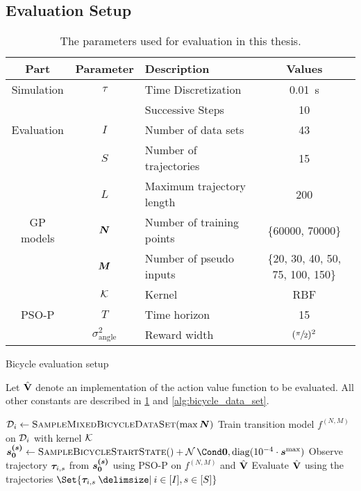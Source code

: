 \subsection{Evaluation Setup}
\begin{table}[t]
    \centering
    \caption{The parameters used for evaluation in this thesis.}
    \label{tab:evaluation_parameters}
    \begin{tabularx}{\tablewidth}{ccXc}
        \toprule
        Part & Parameter & Description & Values \\
        \midrule
        Simulation & $\tau$ & Time Discretization & \SI[mode=text]{0.01}{\second} \\
        & & Successive Steps & 10 \\
        \addlinespace
        Evaluation & $I$ & Number of data sets & 43 \\
        & $S$ & Number of trajectories & 15 \\
        & $L$ & Maximum trajectory length & 200 \\
        \addlinespace
        GP models & $\bm{N}$ & Number of training points & \{60000, 70000\} \\
        & $\bm{M}$ & Number of pseudo inputs & \{20, 30, 40, 50, 75, 100, 150\} \\
        & $\operatorname{\mathcal{K}}$ & Kernel & RBF \\
        \addlinespace
        PSO-P & $T$ & Time horizon & 15 \\
        & $\sigma_{\text{angle}}^2$ & Reward width & $(\sfrac{\pi}{2})^2$ \\
        \bottomrule
    \end{tabularx}
\end{table}
\begin{algorithm}[tp]
    \caption{Bicycle evaluation setup}
    \label{alg:evaluation_setup}
    Let $\operatorname{\hat{\operatorname{\mathbf{V}}}}$ denote an implementation of the action value function to be evaluated.
    All other constants are described in \cref{tab:evaluation_parameters} and \cref{alg:bicycle_data_set}.
    \begin{algorithmic}[1]
            \State $\D_i \gets \Call{SampleMixedBicycleDataSet}{\max \mat{N}}$
                \State Train transition model $f^{(N, M)}$ on $\mathcal{D}_i$ with kernel $\operatorname{\mathcal{K}}$
                \State $\mat{s^{(s)}_0} \gets \Call{SampleBicycleStartState}{\null} + \Gaussian{\mat{0}, \diag(10^{-4} \cdot \mat{s}^{\text{max}})}$
                    \State Observe trajectory $\bm{\tau}_{i, s}$ from $\bm{s^{(s)}_0}$ using PSO-P on $f^{(N, M)}$ and $\operatorname{\hat{\operatorname{\mathbf{V}}}}$
                \EndFor
            \EndFor
        \EndFor
        \State Evaluate $\operatorname{\hat{\operatorname{\mathbf{V}}}}$ using the trajectories $\Set{\Trajectory_{i, s} \with i \in [I], s \in [S]}$
    \end{algorithmic}
\end{algorithm}
